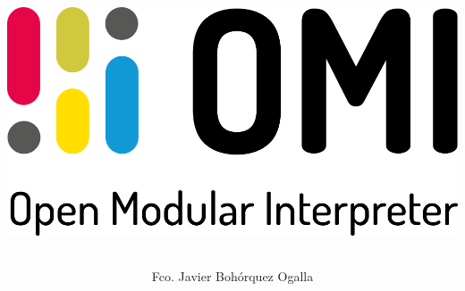 \documentclass[12pt, spanish]{article}
\author{Fco. Javier Bohórquez Ogalla}						%
\date{}														%
\title{ 
\begin{center}
\includegraphics[scale=2.5]{logo-doc.png}
\end{center} 
}
\begin{document}
\maketitle
\pagebreak
\tableofcontents
\pagebreak

\end{document}
